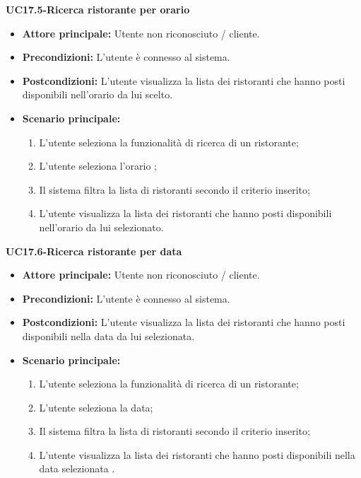 \textbf{UC17.5-Ricerca ristorante per orario}
\begin{itemize}
\item \textbf{Attore principale: }Utente non riconosciuto / cliente.
\item \textbf{Precondizioni:} L'utente è connesso al sistema.
\item \textbf{Postcondizioni:} L'utente visualizza la lista dei ristoranti che hanno posti disponibili nell'orario
da lui scelto.
\item \textbf{Scenario principale:}
\begin{enumerate}
    \item L'utente seleziona la funzionalità di ricerca di un ristorante;
    \item L'utente seleziona l'orario ;
    \item Il sistema filtra la lista di ristoranti secondo il criterio inserito;
    \item L'utente visualizza la lista dei ristoranti che hanno posti disponibili nell'orario da lui
    selezionato.
\end{enumerate}
\end{itemize}

\textbf{UC17.6-Ricerca ristorante per data}
\begin{itemize}
\item \textbf{Attore principale:} Utente non riconosciuto / cliente.
\item \textbf{Precondizioni:} L'utente è connesso al sistema.
\item \textbf{Postcondizioni:} L'utente visualizza la lista dei ristoranti che hanno posti disponibili
nella data da lui selezionata.
\item \textbf{Scenario principale:}
\begin{enumerate}
    \item L'utente seleziona la funzionalità di ricerca di un ristorante;
    \item L'utente seleziona la data;
    \item Il sistema filtra la lista di ristoranti secondo il criterio inserito;
    \item L'utente visualizza la lista dei ristoranti che hanno posti disponibili
    nella data selezionata .
\end{enumerate}
\end{itemize}

